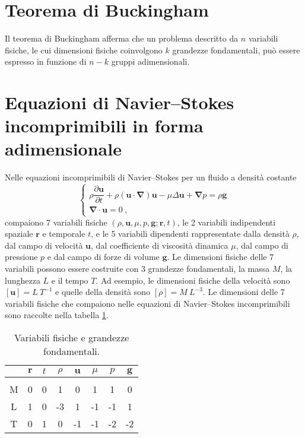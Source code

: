 %
\section{Teorema di Buckingham}
Il teorema di Buckingham afferma che un problema descritto da $n$ variabili fisiche, le cui dimensioni fisiche coinvolgono $k$ grandezze fondamentali, può essere espresso in funzione di $n-k$ gruppi adimensionali.

\section{Equazioni di Navier--Stokes incomprimibili in forma adimensionale}
Nelle equazioni incomprimibili di Navier--Stokes per un fluido a densità costante
\begin{equation}
\begin{cases}
 \rho \dfrac{\partial \bm{u}}{\partial t} + \rho (\bm{u} \cdot \bm{\nabla}) \bm{u} - \mu \Delta \bm{u} + \bm{\nabla} p = \rho \bm{g} \\
 \bm{\nabla} \cdot \bm{u} = 0 \ ,
\end{cases}
\end{equation}
compaiono 7 variabili fisiche $(\rho,\bm{u},\mu,p,\bm{g};\bm{r},t)$, le 2 variabili indipendenti spaziale $\bm{r}$ e temporale $t$, e le 5 variabili dipendenti rappresentate dalla densità $\rho$, dal campo di velocità $\bm{u}$, dal coefficiente di viscosità dinamica $\mu$, dal campo di pressione $p$ e dal campo di forze di volume $\bm{g}$.
Le dimensioni fisiche delle 7 variabili possono essere costruite con 3 grandezze fondamentali, la massa $M$, la lunghezza $L$ e il tempo $T$. Ad esempio, le dimensioni fisiche della velocità sono $[\bm{u}] = L \ T^{-1}$ e quelle della densità sono $[\rho] = M \ L^{-3}$. Le dimensioni delle 7 variabili fisiche che compaiono nelle equazioni di Navier--Stokes incomprimibili sono raccolte nella tabella \ref{tab:adim-ns-1}.
\begin{table}[h]
\begin{center}
\begin{tabular}{c ccccccc}
   & $\bm{r}$ & $t$ & $\rho$ & $\bm{u}$ & $\mu$ & $p$ & $\bm{g}$ \\ 
 \hline \vspace{-10pt}  \\
 M & 0 & 0 &  1 &  0 &  1 &  1 &  0 \\
 L & 1 & 0 & -3 &  1 & -1 & -1 &  1 \\
 T & 0 & 1 &  0 & -1 & -1 & -2 & -2 \\
\end{tabular}
\end{center}
\caption{Variabili fisiche e grandezze fondamentali.}\label{tab:adim-ns-1}
\end{table}
